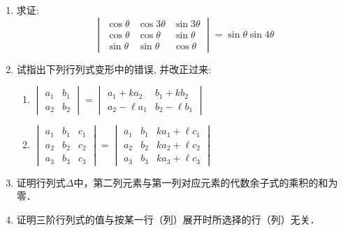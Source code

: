 \begin{enumerate}
\item 求证:
$$
\begin{vmatrix}
\cos \theta & \cos 3 \theta & \sin 3 \theta \\
\cos \theta & \cos \theta & \sin \theta \\
\sin \theta & \sin \theta & \cos \theta
\end{vmatrix}=\sin \theta \sin 4 \theta
$$
\item 试指出下列行列式变形中的错误, 并改正过来:
\begin{enumerate}
    \item $\begin{vmatrix}
        a_1&b_1\\a_2&b_2
    \end{vmatrix}=\begin{vmatrix}
        a_1+ka_2&b_1+kb_2\\a_2-\ell a_1&b_2-\ell b_1
    \end{vmatrix}$
    \item $\begin{vmatrix}
        a_{1} & b_{1} & c_{1} \\ a_{2} & b_{2} & c_{2} \\ a_{3} & b_{3} & c_{3}
    \end{vmatrix}=\begin{vmatrix}
        a_{1} & b_{1} & ka_1+\ell c_{1} \\ a_{2} & b_{2} & ka_2+\ell c_{2} \\ a_{3} & b_{3} & ka_3+\ell c_{3}
    \end{vmatrix}$
\end{enumerate}

\item  证明行列式$\Delta$中，第二列元素与第一列对应元素的代数余子式的乘积的和为零．
\item 证明三阶行列式的值与按某一行（列）展开时所选择的行（列）无关．


\end{enumerate}
